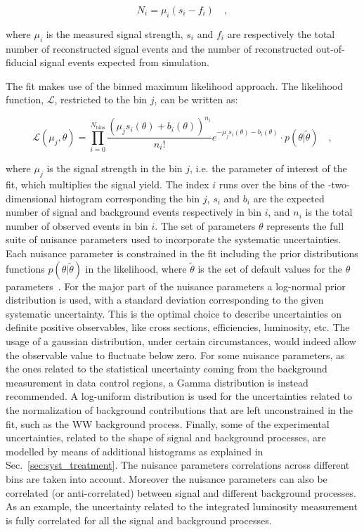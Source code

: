 \begin{equation}\label{eq:sig_yield}
N_i = \mu_i (s_i -f_i) \quad ,
\end{equation}

where $\mu_i$ is the measured signal strength, $s_i$ and $f_i$ are respectively the total number of reconstructed signal events and the number of reconstructed out-of-fiducial signal events expected from simulation.

The fit makes use of the binned maximum likelihood approach. The likelihood function, $\mathcal{L}$, restricted to the \pth bin $j$, can be written as:

\begin{equation}
\mathcal{L}(\mu_j,\theta) = \prod_{i=0}^{N_\mathrm{bins}} \frac{(\mu_j s_i(\theta) + b_i(\theta))^{n_i}}{n_i!}e^{-\mu_j s_i(\theta) - b_i(\theta)} \cdot p(\theta | \tilde{\theta}) \quad ,
\end{equation}

where $\mu_j$ is the signal strength in the bin $j$, i.e. the parameter of interest of the fit, which multiplies the signal yield. The index $i$ runs over the bins of the \mll-\mt two-dimensional histogram corresponding the \pth bin $j$, $s_i$ and $b_i$ are the expected number of signal and background events respectively in bin $i$, and $n_i$ is the total number of observed events in bin $i$. The set of parameters $\theta$ represents the full suite of nuisance parameters used to incorporate the systematic uncertainties. Each nuisance parameter is constrained in the fit including the prior distributions functions $p(\theta | \tilde{\theta})$ in the likelihood, where $\tilde{\theta}$ is the set of default values for the $\theta$ parameters~\cite{CMS-NOTE-2011-005}. For the major part of the nuisance parameters a log-normal prior distribution is used, with a standard deviation corresponding to the given systematic uncertainty. This is the optimal choice to describe uncertainties on definite positive observables, like cross sections, efficiencies, luminosity, etc. The usage of a gaussian distribution, under certain circumstances, would indeed allow the observable value to fluctuate below zero.
For some nuisance parameters, as the ones related to the statistical uncertainty coming from the background measurement in data control regions, a Gamma distribution is instead recommended. 
A log-uniform distribution is used for the uncertainties related to the normalization of background contributions that are left unconstrained in the fit, such as the WW background process.
Finally, some of the experimental uncertainties, related to the shape of signal and background processes, are modelled by means of additional histograms as explained in Sec.~\ref{sec:syst_treatment}. The nuisance parameters correlations across different \pth bins are taken into account. Moreover the nuisance parameters can also be correlated (or anti-correlated) between signal and different background processes. As an example, the uncertainty related to the integrated luminosity measurement is fully correlated for all the signal and background processes.


